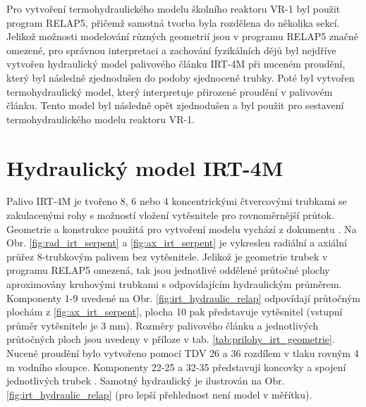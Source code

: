 
Pro vytvoření termohydraulického modelu školního reaktoru VR-1 byl použit program RELAP5, přičemž samotná tvorba byla rozdělena do několika sekcí. Jelikož možnosti modelování různých geometrií jsou v programu RELAP5 značně omezené, pro správnou interpretaci a zachování fyzikálních dějů byl nejdříve vytvořen hydraulický model palivového článku IRT-4M při nuceném proudění, který byl následně zjednodušen do podoby sjednocené trubky. Poté byl vytvořen termohydraulický model, který interpretuje přirozené proudění v palivovém článku. Tento model byl následně opět zjednodušen a byl použit pro sestavení termohydraulického modelu reaktoru VR-1.

\section{Hydraulický model IRT-4M}
\label{sec:hydraulicky_model_irt}
Palivo IRT-4M je tvořeno 8, 6 nebo 4 koncentrickými čtvercovými trubkami se zakulacenými rohy s možností vložení vytěsnitele pro rovnoměrnější průtok. Geometrie a konstrukce použitá pro vytvoření modelu vychází z dokumentu \cite{sedlbauer2019}. Na Obr. \ref{fig:rad_irt_serpent} a \ref{fig:ax_irt_serpent} je vykreslen radiální a axiální průřez 8-trubkovým palivem bez vytěsnitele. Jelikož je geometrie trubek v programu RELAP5 omezená, tak jsou jednotlivé oddělené průtočné plochy aproximovány kruhovými trubkami s odpovídajícím hydraulickým průměrem. Komponenty 1-9 uvedené na Obr. \ref{fig:irt_hydraulic_relap} odpovídají průtočným plochám z \ref{fig:ax_irt_serpent}, plocha 10 pak představuje vytěsnitel (vstupní průměr vytěsnitele je 3 mm). Rozměry palivového článku a jednotlivých průtočných ploch jsou uvedeny v příloze v tab. \ref{tab:prilohy_irt_geometrie}. Nucené proudění bylo vytvořeno pomocí TDV 26 a 36 rozdílem v tlaku rovným 4 m vodního sloupce. Komponenty 22-25 a 32-35 představují koncovky a spojení jednotlivých trubek . Samotný hydraulický je ilustrován na Obr. \ref{fig:irt_hydraulic_relap} (pro lepší přehlednost není model v měřítku). 



